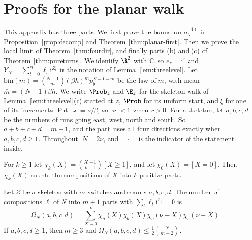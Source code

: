 \section{Proofs for the planar walk}\label{app:planar}

This appendix has three parts. We first prove the bound on $o^{(4)}_N$ in
Proposition~\ref{prop:decomp} and Theorem~\ref{thm:planar-first}. Then we prove the local limit of
Theorem~\ref{thm:fourdir}, and finally parts (b) and (c) of Theorem~\ref{thm:pureturns}. We identify $\R^2$ with $\mathbb C$, so $e_z=\mathrm i^z$ and
$Y_N=\sum_{t=0}^m\ell_t\mathrm i^{Z_t}$ in the notation of Lemma~\ref{lem:threelevel}. Let
$\mathrm{bin}(m)=\binom{N-1}m(\beta h)^mp_0^{N-1-m}$ be the law of $m$, with mean
$\bar m=(N-1)\beta h$. We write $\Prob_z$ and $\E_z$ for the skeleton walk of
Lemma~\ref{lem:threelevel}(c) started at $z$, $\Prob$ for its uniform start, and $\xi$ for one of
its increments. Put $\varkappa=s/\beta$, so $\varkappa<1$ when $r>0$. For a skeleton, let $a,b,c,d$
be the numbers of runs going east, west, north and south. So $a+b+c+d=m+1$, and the path uses all four
directions exactly when $a,b,c,d\ge1$. Throughout, $N=2\nu$, and $[\,\cdot\,]$ is the indicator of
the statement inside.

For $k\ge1$ let $\chi_k(X)=\binom{X-1}{k-1}[X\ge1]$, and let $\chi_0(X)=[X=0]$. Then $\chi_k(X)$
counts the compositions of $X$ into $k$ positive parts.

\begin{lemma}\label{lem:returncount}
Let $Z$ be a skeleton with $m$ switches and counts $a,b,c,d$. The number of compositions $\ell$ of
$N$ into $m+1$ parts with $\sum_t\ell_t\mathrm i^{Z_t}=0$ is
\[
 \Omega_N(a,b,c,d)=\sum_{X=0}^{\nu}\chi_a(X)\chi_b(X)
 \chi_c(\nu-X)\chi_d(\nu-X).
\]
If $a,b,c,d\ge1$, then $m\ge3$ and $\Omega_N(a,b,c,d)\le\frac12\binom N{m-2}$.
\end{lemma}

